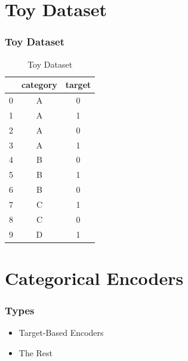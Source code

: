 \documentclass{beamer}
\begin{document}
    \section{Toy Dataset}
    \begin{frame}
        \frametitle{Toy Dataset}
        \begin{table}[htb]
            \begin{center}
            {\renewcommand{\arraystretch}{0.4}
            \renewcommand{\tabcolsep}{0.4cm}
                \begin{tabular}[c]{|c|c|c|}
                    \hline & \textbf{category} & \textbf{target} \\
                    \hline
                    0      & A                 & 0               \\
                    \hline
                    1      & A                 & 1               \\
                    \hline
                    2      & A                 & 0               \\
                    \hline
                    3      & A                 & 1               \\
                    \hline
                    4      & B                 & 0               \\
                    \hline
                    5      & B                 & 1               \\
                    \hline
                    6      & B                 & 0               \\
                    \hline
                    7      & C                 & 1               \\
                    \hline
                    8      & C                 & 0               \\
                    \hline
                    9      & D                 & 1               \\
                    \hline
                \end{tabular}}
                \caption{Toy Dataset}
            \end{center}
        \end{table}
    \end{frame}


    \section{Categorical Encoders}
    \begin{frame}
        \frametitle{Types}
        \begin{itemize}
            \item Target-Based Encoders
            \item The Rest
        \end{itemize}
    \end{frame}
\end{document}

